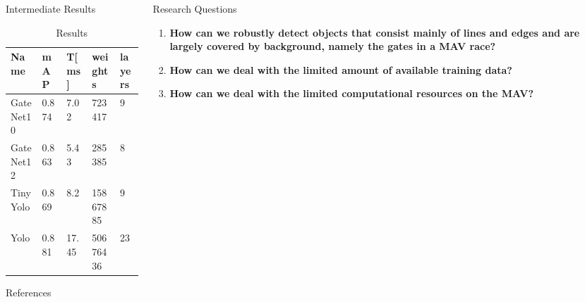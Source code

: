 \documentclass{beamer}
\begin{document}
\begin{frame}[fragile]
\begin{columns}[T]
\begin{column}{.33\textwidth}
\begin{block}{Intermediate Results}
	\centering
	\begin{table}[width=\textwidth]
		\caption{Results}
		\label{tab:models}
		\begin{tabular}{|p{3cm}|p{1cm}|p{1cm}|p{2cm}|p{2cm}|}
			\hline
			Name 		&  mAP   & T{[}ms{]} & weights &   layers   \\ \hline
			GateNet10   &  0.874 & 7.02      & 723417      &   9 \\ \hline
			GateNet12   &  0.863 & 5.43      & 285385       &   8\\ \hline
			TinyYolo    &  0.869 & 8.2       & 15867885      &   9\\ \hline
			Yolo        &  0.881 & 17.45     & 50676436       &   23\\ \hline
		\end{tabular}
	\end{table}

\end{block}
\begin{alertblock}{References}
	
	\nocite{*} %
	\small{
		\vspace{0.75in}}
	
\end{alertblock}

\end{column}



\begin{column}{.66\textwidth}

	
	\begin{block}{Research Questions}
		
		\begin{enumerate}
			\item \textbf{How can we robustly detect objects that consist mainly of lines and edges and are largely covered by background, namely the gates in a MAV race?}
			\item \textbf{How can we deal with the limited amount of available training data?}
			\item \textbf{How can we deal with the limited computational resources on the MAV?}
		\end{enumerate}
		
		
	\end{block}
\begin{figure}


\end{figure}
\end{column}
\end{columns}
\end{frame}
\end{document}
